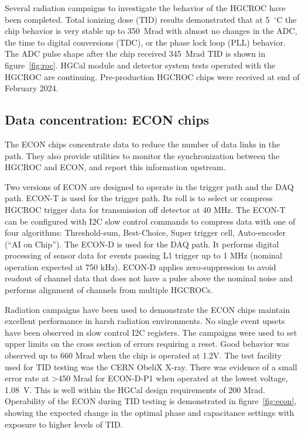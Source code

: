 \documentclass[twocolumn]{webofc}
\begin{document}
Several radiation campaigns to investigate the behavior of the HGCROC have been completed. Total ionizing dose (TID) results demonstrated that at 5~$^{\circ}$C the chip behavior is very stable up to 350~Mrad  with almost no changes in the ADC, the time to digital conversions (TDC), or the phase lock loop (PLL) behavior. The ADC pulse shape after the chip received 345~Mrad TID is shown in figure~\ref{fig:roc}. HGCal module and detector system tests operated with the HGCROC are continuing. Pre-production HGCROC chips were received at end of February 2024.

\subsection{Data concentration: ECON chips}
\label{sec:econ}
The ECON chips concentrate data to reduce the number of data links in the path. They also provide utilities to monitor the synchronization between the HGCROC and ECON, and report this information upstream.

Two versions of ECON are designed to operate in the trigger path and the DAQ path. ECON-T is used for the trigger path. Its roll is to select or compress HGCROC trigger data for transmission off detector at 40 MHz. The ECON-T can be configured with I2C slow control commands to compress data with one of four algorithms: Threshold-sum, Best-Choice, Super trigger cell, Auto-encoder (“AI on Chip”). The ECON-D is used for the DAQ path. It performs digital processing of sensor data for events passing L1 trigger up to 1 MHz (nominal operation expected at 750 kHz). ECON-D applies zero-suppression to avoid readout of channel data that does not have a pulse above the nominal noise and performs alignment of channels from multiple HGCROCs.

Radiation campaigns have been used to demonstrate the ECON chips maintain excellent performance in harsh radiation environments. No single event upsets have been observed in slow control I2C registers. The campaigns were used to set upper limits on the cross section of errors requiring a reset. Good behavior was observed up to 660 Mrad when the chip is operated at 1.2V. The test facility used for TID testing was the CERN ObeliX X-ray. There was evidence of a small error rate at >450 Mrad for ECON-D-P1 when operated at the lowest voltage, 1.08~V. This is well within the HGCal design requirements of 200 Mrad. Operability of the ECON during TID testing is demonstrated in figure~\ref{fig:econ}, showing the expected change in the optimal phase and capacitance settings with exposure to higher levels of TID.
\end{document}
